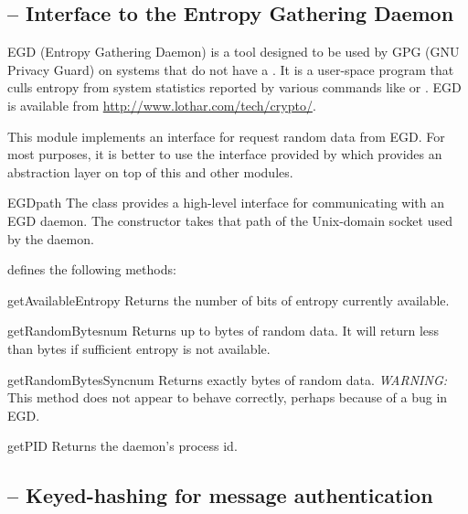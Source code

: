 \documentclass{howto}
\begin{document}
\subsection{
	-- Interface to the Entropy Gathering Daemon}

{EGD} (Entropy Gathering Daemon) is a tool designed to be used by {GPG}
({GNU} Privacy Guard) on systems that do not have a
.  It is a user-space program that culls entropy
from system statistics reported by various commands like 
or .  {EGD} is available from 
\url{http://www.lothar.com/tech/crypto/}.

This module implements an interface for request random data from EGD.
For most purposes, it is better to use the interface provided by
 which provides an abstraction layer on top
of this and other modules.

\begin{classdesc}{EGD}{path}
The  class provides a high-level interface for
communicating with an EGD daemon.  The constructor takes that path of
the Unix-domain socket used by the daemon.

 defines the following methods:

\begin{methoddesc}{getAvailableEntropy}{}
Returns the number of bits of entropy currently available.
\end{methoddesc}

\begin{methoddesc}{getRandomBytes}{num}
Returns up to  bytes of random data.  It will return less
than  bytes if sufficient entropy is not available.
\end{methoddesc}

\begin{methoddesc}{getRandomBytesSync}{num}
Returns exactly  bytes of random data.  \emph{WARNING:} This
method does not appear to behave correctly, perhaps because of a bug
in EGD.
\end{methoddesc}

\begin{methoddesc}{getPID}{}
Returns the daemon's process id.
\end{methoddesc}

\end{classdesc}

\subsection{
	-- Keyed-hashing for message authentication}
\end{document}
